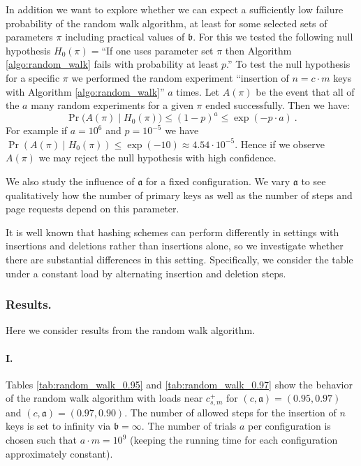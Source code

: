 \let\accentvec\vec \documentclass{llncs}
\newcommand{\palpha}{\mathfrak{a}}
\newcommand{\pbeta}{\mathfrak{b}}
\newcommand{\tb}{{c^{\scriptscriptstyle+}_{s,m}}}
\begin{document}
In addition we want to explore whether we can expect a sufficiently low failure probability of the random walk algorithm, at least for some selected sets of parameters $\pi$ including practical values of $\pbeta$. For this we tested the following null hypothesis 
$H_0(\pi)=$``If one uses parameter set $\pi$ then Algorithm \ref{algo:random_walk} fails with probability at least $p$.''
To test the null hypothesis for a specific $\pi$ we performed the random experiment ``insertion of $n=c\cdot m$ keys with Algorithm \ref{algo:random_walk}'' $a$ times.
Let $A(\pi)$ be the event that all of the $a$ many random experiments for a given $\pi$ ended successfully. Then we have:
\begin{equation}
 \Pr\big( A(\pi) \mid H_0(\pi)\big)\leq (1-p)^a \leq \exp(-p\cdot a) \ .
\end{equation}
For example if $a=10^6$ and $p=10^{-5}$ we have $\Pr( A(\pi) \mid H_0(\pi))\leq \exp(-10)\approx 4.54 \cdot 10^{-5}$. 
Hence if we observe $A(\pi)$ we may reject the null hypothesis with high confidence.

We also study the influence of $\palpha$ for a fixed configuration.
We vary $\palpha$ to see qualitatively how the number of primary
keys as well as the number of steps and page requests depend on this
parameter.

It is well known that hashing schemes can perform differently in
settings with insertions and deletions rather than insertions alone,
so we investigate whether there are substantial differences in this
setting.  Specifically, we consider the table under a constant load by
alternating insertion and deletion steps.

\subsubsection{Results.}  Here we consider results from the random walk algorithm.
\paragraph{I.} Tables \ref{tab:random_walk_0.95} and \ref{tab:random_walk_0.97} show the behavior of the random walk algorithm with loads near $\tb$ for $(c,\palpha)=(0.95,0.97)$ and $(c,\palpha)=(0.97,0.90)$. The number of allowed steps for the insertion of $n$ keys is set to infinity via $\pbeta=\infty$. The number of trials $a$ per configuration is chosen such that $a\cdot m=10^9$ (keeping the running time for each configuration approximately constant).
\end{document}
